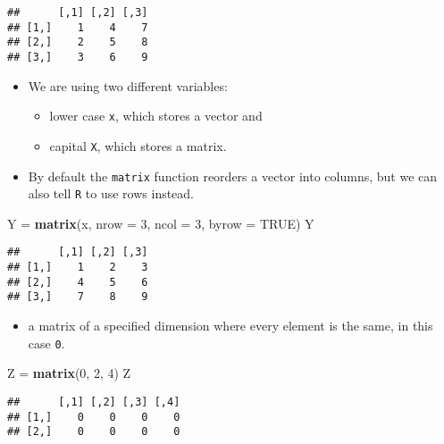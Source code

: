 \documentclass[]{book}
\newenvironment{Shaded}{\begin{snugshade}}{\end{snugshade}}
\newcommand{\DataTypeTok}[1]{\textcolor[rgb]{0.13,0.29,0.53}{#1}}
\newcommand{\DecValTok}[1]{\textcolor[rgb]{0.00,0.00,0.81}{#1}}
\newcommand{\KeywordTok}[1]{\textcolor[rgb]{0.13,0.29,0.53}{\textbf{#1}}}
\newcommand{\NormalTok}[1]{#1}
\newcommand{\OtherTok}[1]{\textcolor[rgb]{0.56,0.35,0.01}{#1}}
\newcommand{\StringTok}[1]{\textcolor[rgb]{0.31,0.60,0.02}{#1}}
\providecommand{\tightlist}{%
  \setlength{\itemsep}{0pt}\setlength{\parskip}{0pt}}
\begin{document}
\begin{verbatim}
##      [,1] [,2] [,3]
## [1,]    1    4    7
## [2,]    2    5    8
## [3,]    3    6    9
\end{verbatim}

\begin{itemize}
\tightlist
\item
  We are using two different variables:

  \begin{itemize}
  \tightlist
  \item
    lower case \texttt{x}, which stores a vector and
  \item
    capital \texttt{X}, which stores a matrix.
  \end{itemize}
\item
  By default the \texttt{matrix} function reorders a vector into columns, but we can also tell \texttt{R} to use rows instead.
\end{itemize}

\begin{Shaded}
\begin{Highlighting}[]
\NormalTok{Y =}\StringTok{ }\KeywordTok{matrix}\NormalTok{(x, }\DataTypeTok{nrow =} \DecValTok{3}\NormalTok{, }\DataTypeTok{ncol =} \DecValTok{3}\NormalTok{, }\DataTypeTok{byrow =} \OtherTok{TRUE}\NormalTok{)}
\NormalTok{Y}
\end{Highlighting}
\end{Shaded}

\begin{verbatim}
##      [,1] [,2] [,3]
## [1,]    1    2    3
## [2,]    4    5    6
## [3,]    7    8    9
\end{verbatim}

\begin{itemize}
\tightlist
\item
  a matrix of a specified dimension where every element is the same, in this case \texttt{0}.
\end{itemize}

\begin{Shaded}
\begin{Highlighting}[]
\NormalTok{Z =}\StringTok{ }\KeywordTok{matrix}\NormalTok{(}\DecValTok{0}\NormalTok{, }\DecValTok{2}\NormalTok{, }\DecValTok{4}\NormalTok{)}
\NormalTok{Z}
\end{Highlighting}
\end{Shaded}

\begin{verbatim}
##      [,1] [,2] [,3] [,4]
## [1,]    0    0    0    0
## [2,]    0    0    0    0
\end{verbatim}
\end{document}
